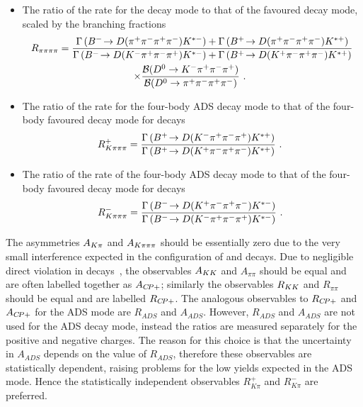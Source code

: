 \begin{itemize}
{{}}
\item{The ratio of the rate for the \decay{\D}{\pip\pim\pip\pim} decay mode to that of the favoured decay mode, scaled by the branching fractions
{\footnotesize
\begin{multline}
R_{\pi\pi\pi\pi} = \frac{\Gamma\left({{{B}^-}}\!\rightarrow {\ensuremath{D}}({{\pi}^+}{{\pi}^-}{{\pi}^+}{{\pi}^-}){{K}^{*-}}\right) + \Gamma\left({{{B}^+}}\!\rightarrow {\ensuremath{D}}({{\pi}^+}{{\pi}^-}{{\pi}^+}{{\pi}^-}){{K}^{*+}}\right)}{\Gamma\left({{{B}^-}}\!\rightarrow {\ensuremath{D}}({{K}^-}{{\pi}^+}{{\pi}^-}{{\pi}^+}){{K}^{*-}}\right) + \Gamma\left({{{B}^+}}\!\rightarrow {\ensuremath{D}}({{K}^+}{{\pi}^-}{{\pi}^+}{{\pi}^-}){{K}^{*+}}\right)} \\
\times \frac{\mathcal{B}(D^0 \rightarrow {\ensuremath{{K}^-}}{\ensuremath{{\pi}^+}}{\ensuremath{{\pi}^-}}{\ensuremath{{\pi}^+}})}{\mathcal{B}(D^0 \rightarrow {\ensuremath{{\pi}^+}}{\ensuremath{{\pi}^-}}{\ensuremath{{\pi}^+}}{\ensuremath{{\pi}^-}})} \text{ . }
\label{eqn:Rpipipipi}
\end{multline}}}
\item{The ratio of the rate for the four-body ADS decay mode to that of the four-body favoured decay mode for \Bp decays
\begin{equation}
R^+_{K\pi\pi\pi} = \frac{\Gamma\left({{{B}^+}}\!\rightarrow {\ensuremath{D}}({{K}^-}{{\pi}^+}{{\pi}^-}{{\pi}^+}){{K}^{*+}}\right)}{\Gamma\left({{{B}^+}}\!\rightarrow {\ensuremath{D}}({{K}^+}{{\pi}^-}{{\pi}^+}{{\pi}^-}){{K}^{*+}}\right)} \text{ . }
\label{eqn:Rplus4body}
\end{equation}
}
\item{The ratio of the rate of the four-body ADS decay mode to that of the four-body favoured decay mode for \Bm decays
\begin{equation}
R^-_{K\pi\pi\pi} = \frac{\Gamma\left({{{B}^-}}\!\rightarrow {\ensuremath{D}}({{K}^+}{{\pi}^-}{{\pi}^+}{{\pi}^-}){{K}^{*-}}\right)}{\Gamma\left({{{B}^-}}\!\rightarrow {\ensuremath{D}}({{K}^-}{{\pi}^+}{{\pi}^-}{{\pi}^+}){{K}^{*-}}\right)} \text{ . }
\label{eqn:Rminus4body}
\end{equation}
}
\end{itemize}

\noindent
The asymmetries $A_{{K}\pi}$ and $A_{{K}\pi\pi\pi}$ should be essentially zero due to the very small interference expected in the configuration of \B and \D decays. Due to negligible direct \CP violation in \D decays~\cite{charmcpv}, the observables $A_{{K}{K}}$ and $A_{\pi\pi}$ should be equal and are often labelled together as $A_{{C\!P}+}$; similarly the observables $R_{{K}{K}}$ and $R_{\pi\pi}$ should be equal and are labelled $R_{{C\!P}+}$. The analogous observables to $R_{{C\!P}+}$ and $A_{{C\!P}+}$ for the ADS mode are $R_{ADS}$ and $A_{ADS}$. However, $R_{ADS}$ and $A_{ADS}$ are not used for the ADS decay mode, instead the ratios are measured separately for the positive and negative charges. The reason for this choice is that the uncertainty in $A_{ADS}$ depends on the value of $R_{ADS}$, therefore these observables are statistically dependent, raising problems for the low yields expected in the ADS mode. Hence the statistically independent observables $R^+_{K\pi}$ and $R^-_{K\pi}$ are preferred.

